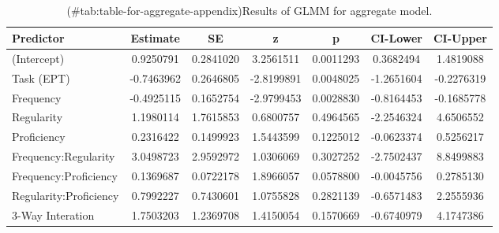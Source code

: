 \clearpage
\makeatletter
\efloat@restorefloats
\makeatother


\begin{appendix}
\section{}
\begin{table}

\caption{(\#tab:table-for-aggregate-appendix)Results of GLMM for aggregate model.}
\centering
\begin{tabular}[t]{l|c|c|c|c|c|c}
\hline
Predictor & Estimate & SE & z & p & CI-Lower & CI-Upper\\
\hline
(Intercept) & 0.9250791 & 0.2841020 & 3.2561511 & 0.0011293 & 0.3682494 & 1.4819088\\
\hline
Task (EPT) & -0.7463962 & 0.2646805 & -2.8199891 & 0.0048025 & -1.2651604 & -0.2276319\\
\hline
Frequency & -0.4925115 & 0.1652754 & -2.9799453 & 0.0028830 & -0.8164453 & -0.1685778\\
\hline
Regularity & 1.1980114 & 1.7615853 & 0.6800757 & 0.4964565 & -2.2546324 & 4.6506552\\
\hline
Proficiency & 0.2316422 & 0.1499923 & 1.5443599 & 0.1225012 & -0.0623374 & 0.5256217\\
\hline
Frequency:Regularity & 3.0498723 & 2.9592972 & 1.0306069 & 0.3027252 & -2.7502437 & 8.8499883\\
\hline
Frequency:Proficiency & 0.1369687 & 0.0722178 & 1.8966057 & 0.0578800 & -0.0045756 & 0.2785130\\
\hline
Regularity:Proficiency & 0.7992227 & 0.7430601 & 1.0755828 & 0.2821139 & -0.6571483 & 2.2555936\\
\hline
3-Way Interation & 1.7503203 & 1.2369708 & 1.4150054 & 0.1570669 & -0.6740979 & 4.1747386\\
\hline
\end{tabular}
\end{table}

\begin{table}


\end{table}
\end{appendix}

